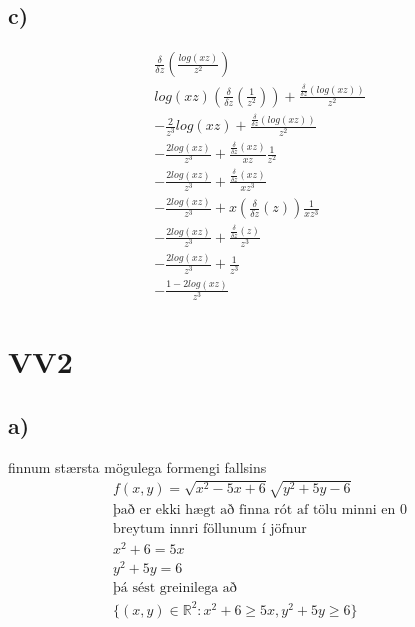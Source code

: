 \documentclass{article}
\begin{document}
\subsection*{c)}
\begin{align*}
    \frac{\delta}{\delta z}(\frac{log(xz)}{z^2})\\
    log(xz)(\frac{\delta}{\delta z}(\frac{1}{z^2}))+\frac{\frac{\delta}{\delta z}(log(xz))}{z^2}\\
    -\frac{2}{z^3}log(xz)+\frac{\frac{\delta}{\delta z}(log(xz))}{z^2}\\
    -\frac{2log(xz)}{z^3}+\frac{\frac{\delta}{\delta z}(xz)}{xz}\frac{1}{z^2}\\
    -\frac{2log(xz)}{z^3}+\frac{\frac{\delta}{\delta z}(xz)}{xz^3}\\
    -\frac{2log(xz)}{z^3}+x(\frac{\delta}{\delta z}(z))\frac{1}{xz^3}\\
    -\frac{2log(xz)}{z^3}+\frac{\frac{\delta}{\delta z}(z)}{z^3}\\
    -\frac{2log(xz)}{z^3}+\frac{1}{z^3}\\
    -\frac{1-2log(xz)}{z^3}
\end{align*}

\section*{VV2}
\subsection*{a)}
finnum stærsta mögulega formengi fallsins
\begin{align*}
    f(x,y)=\sqrt{x^2-5x+6}\sqrt{y^2+5y-6}\\
    \text{það er ekki hægt að finna rót af tölu minni en 0}\\
    \text{breytum innri föllunum í jöfnur}\\
    x^2+6 = 5x\\
    y^2+5y = 6\\
    \text{þá sést greinilega að}\\
    \{(x,y)\in\mathbb{R}^2:x^2+6\ge 5x, y^2+5y\ge6 \}
\end{align*}
\end{document}
